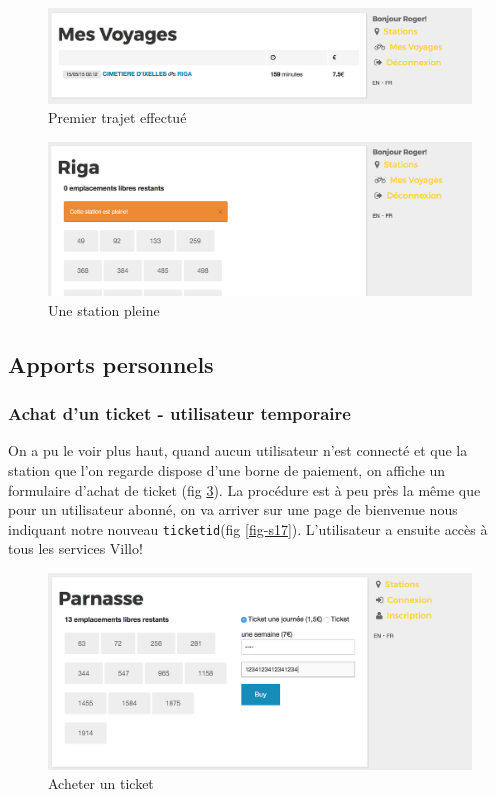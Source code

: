 \documentclass[a4paper]{article}
\begin{document}
    \begin{figure}
	\includegraphics[width=\textwidth]{s14.png}
    \caption{Premier trajet effectué}
    \label{fig-s14}
	\end{figure}
    
    \begin{figure}
	\includegraphics[width=\textwidth]{s15.png}
    \caption{Une station pleine}
    \label{fig-s15}
	\end{figure}
    
    \subsection{Apports personnels}
    
    \subsubsection{Achat d'un ticket - utilisateur temporaire}
    On a pu le voir plus haut, quand aucun utilisateur n'est connecté et que la station que l'on regarde dispose d'une borne de paiement, on affiche un formulaire d'achat de ticket (fig \ref{fig-s16}). La procédure est à peu près la même que pour un utilisateur abonné, on va arriver sur une page de bienvenue nous indiquant notre nouveau \texttt{ticketid}(fig \ref{fig-s17}). L'utilisateur a ensuite accès à tous les services Villo!
    
    \begin{figure}
	\includegraphics[width=\textwidth]{s16.png}
    \caption{Acheter un ticket}
    \label{fig-s16}
	\end{figure}
    
\end{document}
